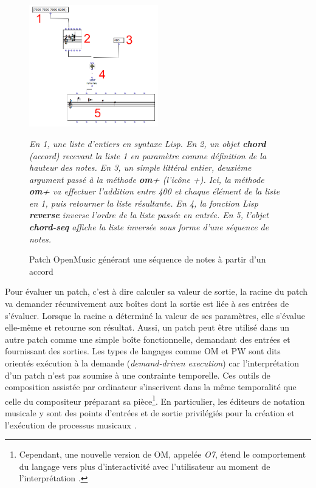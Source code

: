 \begin{figure}[H]
	\centering
	\includegraphics[keepaspectratio=true, width=0.5\textwidth]{OutilsInformatiques/i/exempleOpenMusic.png}
	\caption{Patch OpenMusic générant une séquence de notes à partir d'un accord}
	\label{fig:exempleOpenMusic}
	\small
	\it
	En 1, une liste d'entiers en syntaxe Lisp. En 2, un objet \textbf{chord} (accord) recevant la liste 1 en paramètre comme définition de la hauteur des notes. En 3, un simple littéral entier, deuxième argument passé à la méthode \textbf{om+} (l'icône +). Ici, la méthode \textbf{om+} va effectuer l'addition entre 400 et chaque élément de la liste en 1, puis retourner la liste résultante. En 4, la fonction Lisp \textbf{reverse} inverse l'ordre de la liste passée en entrée. En 5, l'objet \textbf{chord-seq} affiche la liste inversée sous forme d'une séquence de notes.	
\end{figure}

Pour évaluer un patch, c'est à dire calculer sa valeur de sortie, la racine du patch va demander récursivement aux boîtes dont la sortie est liée à ses entrées de s'évaluer. Lorsque la racine a déterminé la valeur de ses paramètres, elle s'évalue elle-même et retourne son résultat.
Aussi, un patch peut être utilisé dans un autre patch comme une simple boîte fonctionnelle, demandant des entrées et fournissant des sorties.
Les types de langages comme OM et PW sont dits orientés \og exécution à la demande \fg (\textit{demand-driven execution}) car l'interprétation d'un patch n'est pas soumise à une contrainte temporelle. Ces outils de composition assistée par ordinateur s'inscrivent dans la même temporalité que celle du compositeur préparant sa pièce\footnote{Cependant, une nouvelle version de OM, appelée \textit{O7}, étend le comportement du langage vers plus d'interactivité avec l'utilisateur au moment de l'interprétation \cite{bresson2017}.}.
En particulier, les éditeurs de notation musicale y sont des points d'entrées et de sortie privilégiés pour la création et l'exécution de processus musicaux \cite{kuuskankare2006, }. 
   

